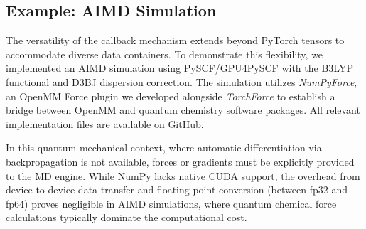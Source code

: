 \subsection{Example: AIMD Simulation}

The versatility of the callback mechanism extends
beyond PyTorch tensors to accommodate diverse data containers.
To demonstrate this flexibility,
we implemented an AIMD simulation using PySCF/GPU4PySCF \cite{Sun2020,Wu2024,Li2024,Lehtola2018}
with the B3LYP functional and D3BJ dispersion correction.
The simulation utilizes \emph{NumPyForce}, an OpenMM Force plugin we developed
alongside \emph{TorchForce} to establish a bridge
between OpenMM and quantum chemistry software packages.
All relevant implementation files are available on GitHub.

In this quantum mechanical context,
where automatic differentiation via backpropagation is not available,
forces or gradients must be explicitly provided to the MD engine.
While NumPy lacks native CUDA support,
the overhead from device-to-device data transfer
and floating-point conversion
(between fp32 and fp64) proves negligible in AIMD simulations,
where quantum chemical force calculations typically
dominate the computational cost.
